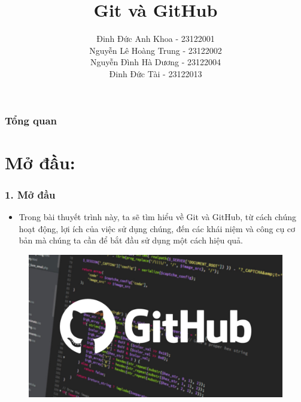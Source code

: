 \documentclass{beamer}
\title[Presentation ]{Git và GitHub
} %
\author{ Đinh Đức Anh Khoa - 23122001 \\ Nguyễn Lê Hoàng Trung - 23122002 \\ Nguyễn Đình Hà Dương - 23122004 \\ Đinh Đức Tài - 23122013
} %
\institute[23TNT1] %
{
FIT@HCMUS \\ %
\medskip
\textit{TPHCM, tháng 10 năm 2023} %
}
\date{} %
\begin{document}
\begin{frame}
\titlepage %
\end{frame}

\begin{frame}
\frametitle{Tổng quan} %
\tableofcontents %
\end{frame}

\section{Mở đầu:} 
\begin{frame}
\frametitle{ 1. Mở đầu}
\begin{itemize}
\item Trong bài thuyết trình này, ta sẽ tìm hiểu về Git và GitHub, từ cách chúng hoạt động, lợi ích của việc sử dụng chúng, đến các khái niệm và công cụ cơ bản mà chúng ta cần để bắt đầu sử dụng một cách hiệu quả.

\end{itemize}

\begin{figure}[h]
\centering\includegraphics[width=1\linewidth]{images/pic1.png}
\end{figure}

\end{frame}
\end{document}
